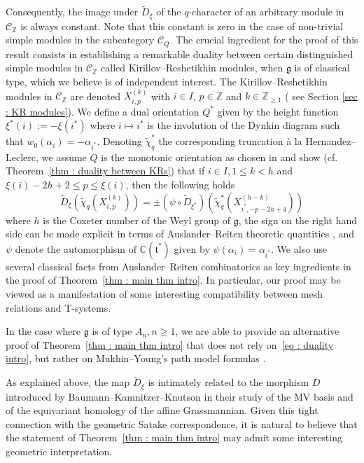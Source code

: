 \documentclass[12pt]{amsart}
\theoremstyle{plain}
\theoremstyle{definition}
\numberwithin{equation}{section}
\newcommand{\ZZ}{{\mathbb {Z}}}
\newcommand{\tchi}{{\widetilde{\chi}}}
\newcommand{\tdxi}{\widetilde{D}_{\xi}}
\newcommand{\barD}{\overline{D}}
\newcommand{\CQ}{\mathcal{C}_Q}
\newcommand{\CZ}{\mathcal{C}_{\mathbb{Z}}}
\begin{document}
Consequently, the image under $\tdxi$ of the $q$-character of an arbitrary module in $\CZ$ is always constant. Note that this constant is zero in the case of non-trivial simple modules in the subcategory $\CQ$.
The crucial ingredient for the proof of this result consists in establishing a remarkable duality between certain distinguished simple modules in $\CZ$ called Kirillov--Reshetikhin modules, when $\mathfrak{g}$ is of classical type, which we believe is of independent interest. The Kirillov--Reshetikhin modules in $\CZ$ are denoted $X_{i,p}^{(k)}$ with $i \in I$, $p \in \ZZ$ and  $k \in \ZZ_{\ge 1}$ ( see Section \ref{sec : KR modules}). We define a dual orientation $Q^{*}$ given by the height function $\xi^{*}(i) := - \xi(i^{*})$ where $i \mapsto i^{*}$ is the involution of the Dynkin diagram such that $w_0(\alpha_i) = - \alpha_{i^{*}}$. Denoting $\tchi_q^{*}$ the corresponding truncation \`a la Hernandez--Leclerc, we assume $Q$ is the monotonic orientation as chosen in  \cite[Figure 1]{CasbiLi} and show (cf. Theorem~\ref{thm : duality between KRs}) that if $i \in I, 1 \leq k < h$ and $\xi(i)-2h+2 \leq p \leq \xi(i)$, then the following holds
\begin{equation} \label{eq : duality intro}
    \tdxi \left( \tchi_q \left( X_{i,p}^{(k)} \right) \right) = \pm  \left( \psi \circ \widetilde{D}_{\xi^{*}} \right) \left( \tchi_q^{*} \left(  X_{i^{*}, -p-2h+4}^{(h-k)}  \right) \right) 
\end{equation}
where $h$ is the Coxeter number of the Weyl group of $\mathfrak{g}$, the sign on the right hand side can be made explicit in terms of Auslander--Reiten theoretic quantities \cite{AR75}, and $\psi$ denote the automorphism of $\mathbb{C}(\mathfrak{t}^{*})$ given by $\psi(\alpha_i) = \alpha_{i^{*}}$. 
We also use several classical facts from Auslander--Reiten combinatorics as key ingredients in the proof of Theorem~\ref{thm : main thm intro}. In particular, our proof may be viewed as a manifestation of some interesting compatibility between mesh relations and T-systems.

 In the case where $\mathfrak{g}$ is of type $A_n, n \geq 1$, we are able to provide an alternative proof of Theorem~\ref{thm : main thm intro} that does not rely on~\eqref{eq : duality intro}, but rather on Mukhin--Young's path model formulas \cite{MY12}. 

As explained above, the map $\tdxi$ is intimately related to the morphism $\barD$ introduced by Baumann--Kamnitzer--Knutson \cite{BKK21} in their study of the MV basis and of the equivariant homology of the affine Grassmannian. Given this tight connection with the geometric Satake correspondence, it is natural to believe that the statement of Theorem~\ref{thm : main thm intro} may admit some interesting geometric interpretation. 
\end{document}
